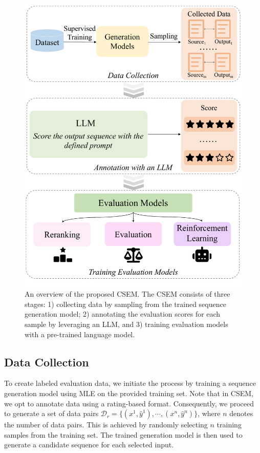 \documentclass[lettersize,journal]{IEEEtran}
\begin{document}
\begin{figure}[t!]
    \centering
    \includegraphics[scale=0.40]{images/main_picture.pdf}
    \vspace{-3mm}
    \caption{
    An overview of the proposed CSEM. 
    The CSEM consists of three stages: 1) collecting data by sampling from the trained sequence generation model; 2) annotating the evaluation scores for each sample by leveraging an LLM, and 3) training evaluation models with a pre-trained language model.
    }
    \vspace{-4mm}
    \label{fig:main_image}
\end{figure}


\subsection{Data Collection}
\label{sec:data-collection}
To create labeled evaluation data, we initiate the process by training a sequence generation model using MLE on the provided training set. Note that in CSEM, we opt to annotate data using a rating-based format. Consequently, we proceed to generate a set of data pairs $\mathcal{D}_{r}=\{(x^1, \hat{y}^1), \cdots, (x^n, \hat{y}^n)\}$, where $n$ denotes the number of data pairs. This is achieved by randomly selecting $n$ training samples from the training set. The trained generation model is then used to generate a candidate sequence for each selected input. 
\end{document}
